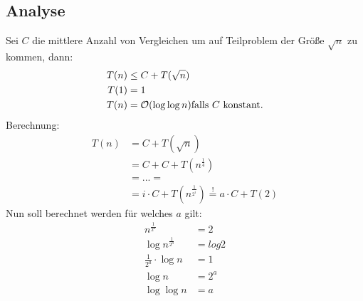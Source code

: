         \subsection{Analyse}
            Sei $C$ die mittlere Anzahl von Vergleichen um auf Teilproblem der Größe $\sqrt{n}$ zu kommen, dann: \\
            \begin{align*}
                T(n) &\leq C + T(\sqrt{n}) \\
                T(1) &= 1 \\
                T(n) &= \mathcal{O}(\log \log n) \text{falls } C \text{ konstant.}
            \end{align*}
            Berechnung:
            \begin{align*}
                T(n) &= C + T(\sqrt{n})  \\
                &= C + C + T\left(n^{\frac{1}{4}}\right) \\
                &= ... = \\
                &= i \cdot C + T\left(n^{\frac{1}{2^i}}\right) \overset{!}{=} a \cdot C + T(2)
            \end{align*}
            Nun soll berechnet werden für welches $a$ gilt:
            \begin{align*}
                n^{\frac{1}{2^{a}}} &= 2 \\
                \log n^{\frac{1}{2^{a}}} &= log 2 \\
                \frac{1}{2^{a}}\cdot \log n &= 1 \\
                \log n &= 2^{a} \\
                \log{ \log n} &= a
            \end{align*}
        
